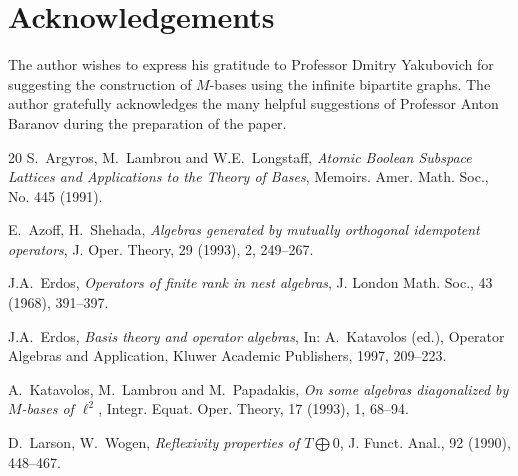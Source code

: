 \documentclass[12pt,oneside,a4paper]{amsart}
\begin{document}
  \section{Acknowledgements}
    The author wishes to express his gratitude to Professor Dmitry Yakubovich for suggesting
      the construction of $M$-bases using the infinite bipartite graphs.
    The author gratefully acknowledges the many helpful suggestions of
      Professor Anton Baranov during the preparation of the paper.
\begin {thebibliography}{20}
    S.~\!Argyros, M.~\!Lambrou and W.E.~\!Longstaff,
    \emph{Atomic Boolean Subspace Lattices and Applications to the Theory of Bases},
    Memoirs. Amer. Math. Soc., No. 445 (1991).

    E.~\!Azoff, H.~\!Shehada,
    \emph{Algebras generated by mutually orthogonal idempotent operators},
    J. Oper. Theory, 29 (1993), 2, 249--267.




    J.A.~\!Erdos,
    \emph{Operators of finite rank in nest algebras},
    J. London Math. Soc., 43 (1968), 391--397.

    J.A.~\!Erdos,
    \emph{Basis theory and operator algebras},
    In: A.~\!Katavolos (ed.), Operator Algebras and Application, Kluwer Academic Publishers, 1997, 209--223.

    A.~\!Katavolos, M.~\!Lambrou and M.~\!Papadakis,
    \emph{On some algebras diagonalized by $M$-bases of $\ell^2$},
    Integr. Equat. Oper. Theory, 17 (1993), 1, 68--94.

    D.~\!Larson, W.~\!Wogen,
    \emph{Reflexivity properties of $T\bigoplus0$},
    J. Funct. Anal., 92 (1990), 448--467.


\end{thebibliography}
\end{document}
